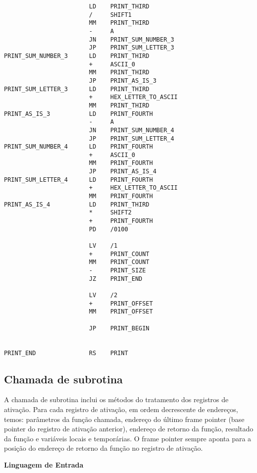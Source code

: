 \begin{lstlisting}
                        LD    PRINT_THIRD
                        /     SHIFT1
                        MM    PRINT_THIRD
                        -     A
                        JN    PRINT_SUM_NUMBER_3
                        JP    PRINT_SUM_LETTER_3
PRINT_SUM_NUMBER_3      LD    PRINT_THIRD 
                        +     ASCII_0
                        MM    PRINT_THIRD
                        JP    PRINT_AS_IS_3
PRINT_SUM_LETTER_3      LD    PRINT_THIRD 
                        +     HEX_LETTER_TO_ASCII
                        MM    PRINT_THIRD
PRINT_AS_IS_3           LD    PRINT_FOURTH
                        -     A
                        JN    PRINT_SUM_NUMBER_4
                        JP    PRINT_SUM_LETTER_4
PRINT_SUM_NUMBER_4      LD    PRINT_FOURTH
                        +     ASCII_0
                        MM    PRINT_FOURTH
                        JP    PRINT_AS_IS_4
PRINT_SUM_LETTER_4      LD    PRINT_FOURTH
                        +     HEX_LETTER_TO_ASCII
                        MM    PRINT_FOURTH
PRINT_AS_IS_4           LD    PRINT_THIRD
                        *     SHIFT2
                        +     PRINT_FOURTH
                        PD    /0100

                        LV    /1
                        +     PRINT_COUNT
                        MM    PRINT_COUNT
                        -     PRINT_SIZE
                        JZ    PRINT_END

                        LV    /2
                        +     PRINT_OFFSET
                        MM    PRINT_OFFSET

                        JP    PRINT_BEGIN


PRINT_END               RS    PRINT

\end{lstlisting}

\subsection{Chamada de subrotina}
A chamada de subrotina inclui os métodos do tratamento dos registros de ativação. Para cada registro de ativação, em ordem decrescente de endereços, temos: parâmetros da função chamada, endereço do último frame pointer (base pointer do registro de ativação anterior), endereço de retorno da função, resultado da função e variáveis locais e temporárias. O frame pointer sempre aponta para a posição do endereço de retorno da função no registro de ativação.

\textbf{Linguagem de Entrada}\\ 

